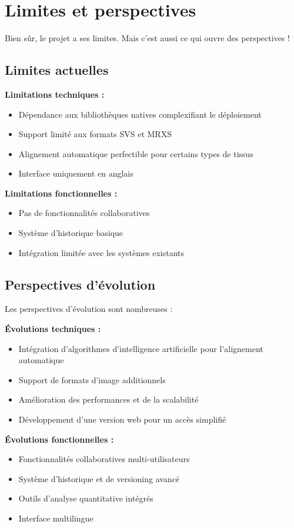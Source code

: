 \documentclass[11pt,a4paper]{report}
\begin{document}
\section{Limites et perspectives}

Bien sûr, le projet a ses limites. Mais c'est aussi ce qui ouvre des perspectives !

\subsection{Limites actuelles}

\textbf{Limitations techniques :}
\begin{itemize}
\item Dépendance aux bibliothèques natives complexifiant le déploiement
\item Support limité aux formats SVS et MRXS
\item Alignement automatique perfectible pour certains types de tissus
\item Interface uniquement en anglais
\end{itemize}

\textbf{Limitations fonctionnelles :}
\begin{itemize}
\item Pas de fonctionnalités collaboratives
\item Système d'historique basique
\item Intégration limitée avec les systèmes existants
\end{itemize}

\subsection{Perspectives d'évolution}

Les perspectives d'évolution sont nombreuses :

\textbf{Évolutions techniques :}
\begin{itemize}
\item Intégration d'algorithmes d'intelligence artificielle pour l'alignement automatique
\item Support de formats d'image additionnels
\item Amélioration des performances et de la scalabilité
\item Développement d'une version web pour un accès simplifié
\end{itemize}

\textbf{Évolutions fonctionnelles :}
\begin{itemize}
\item Fonctionnalités collaboratives multi-utilisateurs
\item Système d'historique et de versioning avancé
\item Outils d'analyse quantitative intégrés
\item Interface multilingue
\end{itemize}
\end{document}
